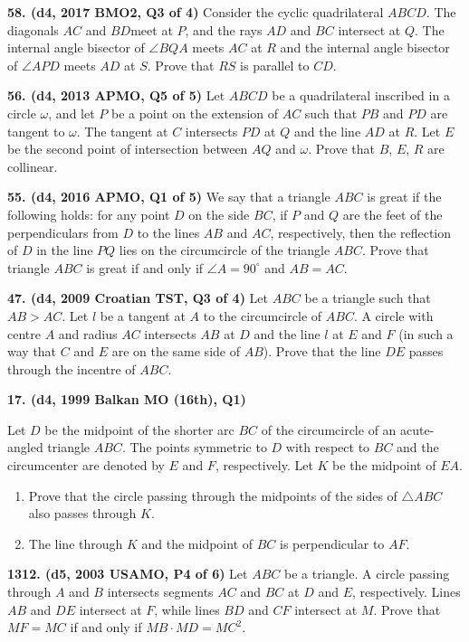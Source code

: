 \documentclass{article}
\begin{document}
\textbf{58. (\color{red}d4\color{black}, 2017 BMO2, Q3 of 4)} Consider the cyclic quadrilateral \(ABCD\). The diagonals \(AC\) and \(BD\)meet at \(P\), and the rays \(AD\) and \(BC\) intersect at \(Q\). The internal angle bisector of \(\angle BQA\) meets \(AC\) at \(R\) and the internal angle bisector of \(\angle APD\) meets \(AD\) at \(S\). Prove that \(RS\) is parallel to \(CD\).

\textbf{56. (\color{red}d4\color{black}, 2013 APMO, Q5 of 5)} Let $ABCD$ be a quadrilateral inscribed in a circle $\omega$, and let $P$ be a point on the extension of $AC$ such that $PB$ and $PD$ are tangent to $\omega$. The tangent at $C$ intersects $PD$ at $Q$ and the line $AD$ at $R$. Let $E$ be the second point of intersection between $AQ$ and $\omega$. Prove that $B$, $E$, $R$ are collinear.

\textbf{55. (\color{red}d4\color{black}, 2016 APMO, Q1 of 5)} We say that a triangle $ABC$ is great if the following holds: for any point $D$ on the side $BC$, if $P$ and $Q$ are the feet of the perpendiculars from $D$ to the lines $AB$ and $AC$, respectively, then the reflection of $D$ in the line $PQ$ lies on the circumcircle of the triangle $ABC$. Prove that triangle $ABC$ is great if and only if $\angle A = 90^{\circ}$ and $AB = AC$.

\textbf{47. (\color{red}d4\color{black}, 2009 Croatian TST, Q3 of 4)} Let $ABC$ be a triangle such that $AB > AC$. Let $l$ be a tangent at $A$ to the circumcircle of $ABC$. A circle with centre $A$ and radius $AC$ intersects $AB$ at $D$ and the line $l$ at $E$ and $F$ (in such a way that $C$ and $E$ are on the same side of $AB$). Prove that the line $DE$ passes through the incentre of $ABC$.

\textbf{17. (\color{red}d4\color{black}, 1999 Balkan MO (16th), Q1)} \begin{flushleft} Let $D$ be the midpoint of the shorter arc $BC$ of the circumcircle of an acute-angled triangle $ABC$. The points symmetric to $D$ with respect to $BC$ and the circumcenter are denoted by $E$ and $F$, respectively. Let $K$ be the midpoint of $EA$. \begin{enumerate} \item Prove that the circle passing through the midpoints of the sides of $\triangle ABC$ also passes through $K$. \item The line through $K$ and the midpoint of $BC$ is perpendicular to $AF$. \end{enumerate}
\end{flushleft}
\textbf{1312. (\color{red}d5\color{black}, 2003 USAMO, P4 of 6)} Let $ABC$ be a triangle. A circle passing through $A$ and $B$ intersects segments $AC$ and $BC$ at $D$ and $E$, respectively. Lines $AB$ and $DE$ intersect at $F$, while lines $BD$ and $CF$ intersect at $M$. Prove that $MF = MC$ if and only if $MB\cdot MD = MC^2$.
\end{document}
